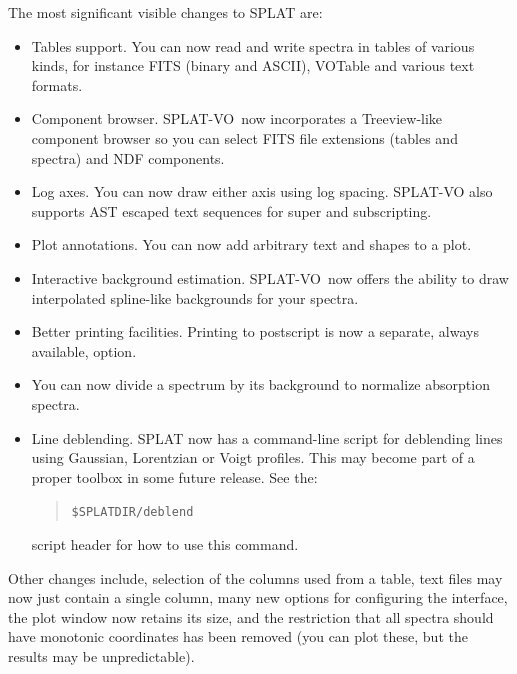 \documentclass[twoside,11pt]{article}
\renewcommand{\_}{\texttt{\symbol{95}}}
\newcommand{\SPLAT}{\textsf{SPLAT-VO}}
\newcommand{\hitext}[1]{\texttt{#1}}
\begin{document}
The most significant visible changes to SPLAT are:
\begin{itemize}
    \item Tables support. You can now read and write spectra in tables of
    various kinds, for instance FITS (binary and ASCII), VOTable and various
    text formats.

    \item Component browser. \SPLAT\ now incorporates a Treeview-like
    component browser so you can select FITS file extensions (tables and
    spectra) and NDF components.

    \item Log axes. You can now draw either axis using log spacing. \SPLAT
    also supports AST escaped text sequences for super and subscripting.

    \item Plot annotations. You can now add arbitrary text and shapes to a
    plot.

    \item Interactive background estimation. \SPLAT\ now offers the ability to
    draw interpolated spline-like backgrounds for your spectra.

    \item Better printing facilities. Printing to postscript is now a separate,
    always available, option.

    \item You can now divide a spectrum by its background to normalize
    absorption spectra.

    \item Line deblending. SPLAT now has a command-line script for deblending
    lines using Gaussian, Lorentzian or Voigt profiles. This may become part
    of a proper toolbox in some future release. See the:
    \begin{quote}
       \hitext{\$SPLAT\_DIR/deblend}
    \end{quote}
    script header for how to use this command.

\end{itemize}
Other changes include, selection of the columns used from a table, text files
may now just contain a single column, many new options for configuring the
interface, the plot window now retains its size, and the restriction that all
spectra should have monotonic coordinates has been removed (you can plot
these, but the results may be unpredictable).
\end{document}
